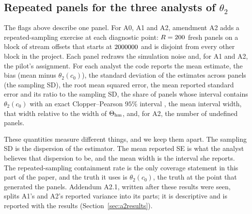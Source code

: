 \subsection{Repeated panels for the three analysts of \texorpdfstring{$\theta_2$}{theta2}}\label{sec:repeated}

The flags above describe one panel. For A0, A1 and A2, amendment A2 adds a
repeated-sampling exercise at each diagnostic point: $R=200$ fresh panels
on a block of stream offsets that starts at $2000000$ and is disjoint
from every other block in the project. Each panel redraws the simulation noise and,
for A1 and A2, the pilot's assignment. For each analyst the code reports the mean
estimate, the bias (mean minus $\theta_2(c_0)$), the standard deviation of the
estimates across panels (the sampling SD), the root mean squared error, the mean
reported standard error and its ratio to the sampling SD, the share of panels whose
interval contains $\theta_2(c_0)$ with an exact Clopper--Pearson $95\%$ interval
\citep{clopper1934}, the mean interval width, that width relative to the width of
$\Theta_{\mathrm{hm}}$, and, for A2, the number of undefined panels.

These quantities measure different things, and we keep them apart. The sampling
SD is the dispersion of the estimator. The mean reported SE is what the analyst
believes that dispersion to be, and the mean width is the interval she reports.
The repeated-sampling containment rate is the only coverage statement in this
part of the paper, and the truth it uses is $\theta_2(c_0)$, the truth at the
point that generated the panels. Addendum A2.1, written after these results were seen,
splits A1's and A2's reported variance into its parts; it is descriptive and is
reported with the results (Section~\ref{sec:a2results}).
